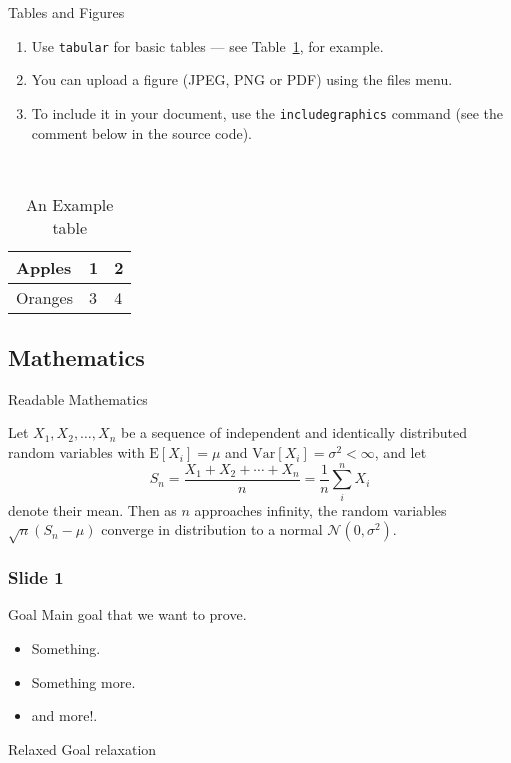 \documentclass[color=usenames,dvipsnames]{beamer}
\begin{document}
\begin{frame}{Tables and Figures}

\begin{enumerate}
\item Use \texttt{tabular} for basic tables --- see Table~\ref{tab:widgets}, for example.
\item You can upload a figure (JPEG, PNG or PDF) using the files menu. 
\item To include it in your document, use the \texttt{includegraphics} command (see the comment below in the source code).
\end{enumerate}

\
\begin{table}
\label{tab:widgets}
\caption{An Example table}
\begin{tabular}{l l l}
\midrule
Apples & 1 & 2 \\
\midrule
\color{Green}Oranges &\color{Green} 3& \color{Green}4
\end{tabular}
\end{table}



\end{frame}

\subsection{Mathematics}

\begin{frame}{Readable Mathematics}

Let $X_1, X_2, \ldots, X_n$ be a sequence of independent and identically distributed random variables with $\text{E}[X_i] = \mu$ and $\text{Var}[X_i] = \sigma^2 < \infty$, and let
$$S_n = \frac{X_1 + X_2 + \cdots + X_n}{n}
      = \frac{1}{n}\sum_{i}^{n} X_i$$
denote their mean. Then as $n$ approaches infinity, the random variables $\sqrt{n}(S_n - \mu)$ converge in distribution to a normal $\mathcal{N}(0, \sigma^2)$.

\end{frame}


\begin{frame}

\frametitle{Slide 1}
\pause
\begin{block}{Goal}
Main goal that we want to prove.
\end{block}
\pause

\begin{itemize}
\item \color{RedOrange} Something.
\pause
\item \color{Green}
 Something more.
\pause
\item and more!.
\end{itemize}
\pause

\begin{block}{Relaxed Goal}
relaxation
\end{block}
\end{frame}
\end{document}
